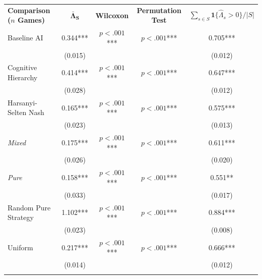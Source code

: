 \begin{tabular}{l c c c c}
    \hline \addlinespace[4pt]
    \textbf{Comparison ($n$ Games)} & \multicolumn{1}{c}{\textbf{$\mathbf{\bar{\Lambda}_S}$}} & \multicolumn{1}{c}{\textbf{Wilcoxon}} & \multicolumn{1}{c}{\textbf{Permutation Test}} & \multicolumn{1}{c}{\textbf{$\sum_{s \in S} \mathbf 1\{\hat \Lambda_s > 0\} / |S|$}} \\
\addlinespace[6pt]\hline\addlinespace[6pt]
Baseline AI & \phantom{(}\phantom{....}0.344*** & $p<.001$*** & $p<.001$*** & \phantom{(}\phantom{....}0.705*** \\
 &  (0.015) & & &  (0.012) \\
\addlinespace[2pt]
\addlinespace[6pt]
Cognitive Hierarchy & \phantom{(}\phantom{....}0.414*** & $p<.001$*** & $p<.001$*** & \phantom{(}\phantom{....}0.647*** \\
 &  (0.028) & & &  (0.012) \\
\addlinespace[2pt]
\addlinespace[6pt]
Harsanyi-Selten Nash & \phantom{(}\phantom{....}0.165*** & $p<.001$*** & $p<.001$*** & \phantom{(}\phantom{....}0.575*** \\
 &  (0.023) & & &  (0.013) \\
\addlinespace[2pt]
\quad\quad \textit{Mixed} & \phantom{(}\phantom{....}0.175*** & $p<.001$*** & $p<.001$*** & \phantom{(}\phantom{....}0.611*** \\
 &  (0.026) & & &  (0.020) \\
\addlinespace[2pt]
\quad\quad \textit{Pure} & \phantom{(}\phantom{....}0.158*** & $p<.001$*** & $p<.001$*** & \phantom{(}\phantom{..}0.551** \\
 &  (0.033) & & &  (0.017) \\
\addlinespace[2pt]
\addlinespace[6pt]
Random Pure Strategy & \phantom{(}\phantom{....}1.102*** & $p<.001$*** & $p<.001$*** & \phantom{(}\phantom{....}0.884*** \\
 &  (0.023) & & &  (0.008) \\
\addlinespace[2pt]
\addlinespace[6pt]
Uniform & \phantom{(}\phantom{....}0.217*** & $p<.001$*** & $p<.001$*** & \phantom{(}\phantom{....}0.666*** \\
 &  (0.014) & & &  (0.012) \\
\addlinespace[2pt]
\hline
\end{tabular}
